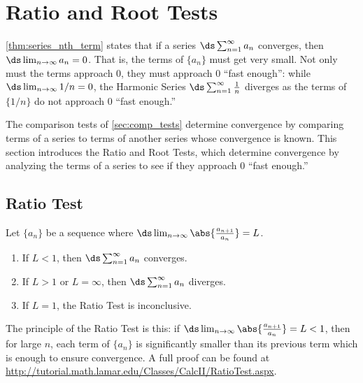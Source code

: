 \section{Ratio and Root Tests}\label{sec:ratio_root_tests}

\autoref{thm:series_nth_term} states that if a series $\ds\sum_{n=1}^\infty a_n$ converges, then $\ds \lim_{n\to \infty} a_n =0$. That is, the terms of $\{a_n\}$ must get very small. Not only must the terms approach 0, they must approach 0 ``fast enough'': while $\ds \lim_{n\to\infty}1/n=0$, the Harmonic Series $\ds\sum_{n=1}^\infty \frac1n$ diverges as the terms of $\{1/n\}$ do not approach 0 ``fast enough.''

The comparison tests of \autoref{sec:comp_tests} determine convergence by comparing terms of a series to terms of another series whose convergence is known. This section introduces the Ratio and Root Tests, which determine convergence by analyzing the terms of a series to see if they approach 0 ``fast enough.''

\subsection{Ratio Test}

\begin{theorem}\label{thm:ratio_test}
Let $\{a_n\}$ be a sequence where $\ds \lim_{n\to\infty}\abs{\frac{a_{n+1}}{a_n}} = L$.%
%
\begin{enumerate}
	\item If $L<1$, then $\ds\sum_{n=1}^\infty a_n$ converges.
	\item If $L>1$ or $L=\infty$, then $\ds\sum_{n=1}^\infty a_n$ diverges.
	\item If $L=1$, the Ratio Test is inconclusive.
\end{enumerate}
\end{theorem}


The principle of the Ratio Test is this: if $\ds\lim_{n\to\infty}\abs{\frac{a_{n+1}}{a_n}} = L<1$, then for large $n$, each term of $\{a_n\}$ is significantly smaller than its previous term which is enough to ensure convergence.  A full proof can be found at \url{http://tutorial.math.lamar.edu/Classes/CalcII/RatioTest.aspx}.

